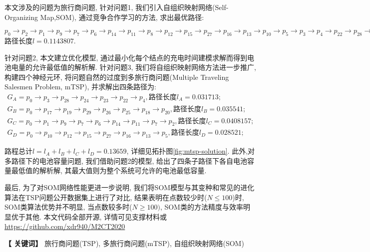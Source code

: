 \newpage


\centerline{\fangsong\bf{}}


\vskip 1cm


\vskip 10bp

{
	\kaishu	
	本文涉及的问题为旅行商问题,
	针对问题1, 我们引入自组织映射网络(Self-Organizing Map,SOM), 通过竞争合作学习的方法, 求出最优路径:
	
	$p_{0}\rightarrow p_2\rightarrow p_1\rightarrow p_9\rightarrow p_7\rightarrow p_6\rightarrow p_{14}\rightarrow p_{11}\rightarrow p_{8}\rightarrow  p_{12}\rightarrow  p_{15}\rightarrow  p_{27}\rightarrow  p_{16}\rightarrow  p_{13}\rightarrow  p_{10}\rightarrow p_{5}\rightarrow p_{3}\rightarrow p_{4}\rightarrow p_{22}\rightarrow  p_{28}\rightarrow p_{24}\rightarrow p_{23}\rightarrow p_{21}\rightarrow p_{29}\rightarrow p_{26}\rightarrow p_{25}\rightarrow p_{18}\rightarrow p_{19}\rightarrow p_{20}\rightarrow p_{17}$
	路径长度$l= 0.1143807$.
	
	针对问题2, 本文建立优化模型, 通过最小化每个结点的充电时间建模求解而得到电池电量的允许最低值的解析解.
	针对问题3, 我们将自组织映射网络方法进一步推广, 构建四个神经元环, 将问题自然的过度到多旅行商问题(Multiple Traveling Salesmen Problem, mTSP), 并求解出四条路径为:
	\begin{eqnarray}
		\nonumber
	G_A = p_0 \rightarrow p_3 \rightarrow p_{28} \rightarrow p_{24} \rightarrow p_{23} \rightarrow p_{22} \rightarrow p_{4}, \text{路径长度} l_A = 0.031713;\\ 
	\nonumber
	G_B = p_0  \rightarrow p_{17} \rightarrow p_{19} \rightarrow p_{29} \rightarrow p_{26} \rightarrow p_{25} \rightarrow p_{18} \rightarrow p_{20}, \text{路径长度}l_B = 0.035541;\\
	\nonumber
	G_C = p_{0} \rightarrow p_{1} \rightarrow  p_{9} \rightarrow  p_{7} \rightarrow  p_{6} \rightarrow  p_{14} \rightarrow  p_{11} \rightarrow   p_{7} \rightarrow  p_{2} , \text{路径长度} l_C = 0.0408157;\\
	\nonumber
	G_D = p_{0} \rightarrow  p_{10} \rightarrow  p_{12} \rightarrow  p_{15} \rightarrow  p_{27} \rightarrow  p_{16} \rightarrow  p_{13} \rightarrow  p_{5} , \text{路径长度} l_D = 0.028521; 
	\end{eqnarray}

	路程总计$l = l_A +l_B+l_C+l_D = 0.13659$, 详细见拓扑图\ref{fig:mtsp-solution}. 此外,对多路径下的电池容量问题, 我们借助问题2的模型, 给出了四条子路径下各自电池容量最低值的解析解, 其最大值则为整个系统可允许的电池最低容量.

	最后, 为了对SOM网络性能更进一步说明, 我们将SOM模型与其变种和常见的进化算法在TSP问题公开数据集上进行了对比, 结果表明在点数较少时($N \leq 100$)时, SOM类算法优势并不明显, 当点数较多时($N \geq 100)$, SOM类的方法精度与效率明显优于其他.
	 本文代码全部开源, 详情可见支撑材料或\url{https://github.com/xdr940/M2CT2020}

	
	\vskip 10bp
	
	\hspace{5bp} {\textbf{【 关键词】}} 
	旅行商问题(TSP), 多旅行商问题(mTSP), 自组织映射网络(SOM) 
}